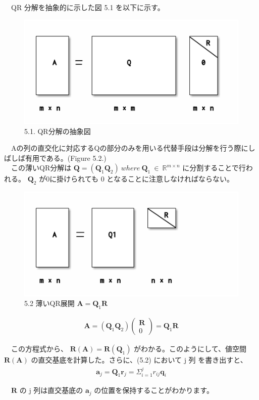 \documentclass[dvipdfmx,10pt,presentation]{beamer}
\begin{document}
\begin{frame}[allowframebreaks]{}
　QR 分解を抽象的に示した図 5.1 を以下に示す。\\

\begin{figure}[htbp]
\centering
\includegraphics[width=.9\linewidth]{./figure5-1.png}
\caption{5.1. QR分解の抽象図}
\end{figure}

　Aの列の直交化に対応するQの部分のみを用いる代替手段は分解を行う際にしばしば有用である。(Figure 5.2.)\\
　この薄いQR分解は \(\bm{Q} = (\bm{Q}_1\bm{Q}_2)\ where\ \bm{Q}_1\ \in\ \mathbb{R}^{m\times n}\) に分割することで行われる。 \(\bm{Q}_2\) が0に掛けられても 0 となることに注意しなければならない。\\

\begin{figure}[htbp]
\centering
\includegraphics[width=.9\linewidth]{./figure5-2.png}
\caption{5.2 薄いQR展開 \(\bm{A} = \bm{Q}_1\bm{R}\)}
\end{figure}

\begin{align}
\bm{A} = (\bm{Q}_1\bm{Q}_2)\begin{pmatrix}\bm{R}\\0\end{pmatrix}=\bm{Q}_1\bm{R}
\tag{5.2}
\end{align}

　この方程式から、 \(\bm{R}(\bm{A})=\bm{R}(\bm{Q}_1)\) がわかる。このようにして、値空間 \(\bm{R(A)}\) の直交基底を計算した。さらに、(5.2) において j 列 を書き出すと、\\

\begin{align*}
\bm{a}_j = \bm{Q}_1\bm{r}_j = \Sigma^j_{i = 1}r_{ij}\bm{q}_i
\end{align*}

　\(\bm{R}\) の j 列は直交基底の \(\bm{a}_j\) の位置を保持することがわかります。\\
\end{frame}
\end{document}
